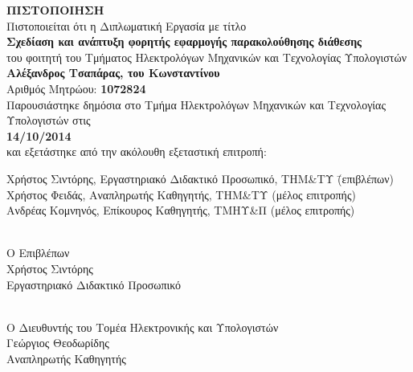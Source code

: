 \thispagestyle{empty}

\begin{center}

    \textbf{\LARGE ΠΙΣΤΟΠΟΙΗΣΗ}\\[2em]
    
    Πιστοποιείται ότι η Διπλωματική Εργασία με τίτλο \\[1em]
    
    \textbf{\Large Σχεδίαση και ανάπτυξη φορητής εφαρμογής παρακολούθησης διάθεσης} \\[2em]
    
    του φοιτητή του Τμήματος Ηλεκτρολόγων Μηχανικών και Τεχνολογίας Υπολογιστών \\[2em]
    
    \textbf{\large Αλέξανδρος Τσαπάρας, του Κωνσταντίνου} \\[1em]
    
    Αριθμός Μητρώου: \textbf{1072824} \\[2em]
    
    Παρουσιάστηκε δημόσια στο Τμήμα Ηλεκτρολόγων Μηχανικών και Τεχνολογίας Υπολογιστών στις \\[2em]
    
    \textbf{14/10/2014} \\[2em]
    
    και εξετάστηκε από την ακόλουθη εξεταστική επιτροπή: \\[3em]
    
    \begin{tabbing}
        Χρήστος Σιντόρης, Εργαστηριακό Διδακτικό Προσωπικό, ΤΗΜ\&ΤΥ \hspace{1cm} \= (επιβλέπων) \\
        Χρήστος Φειδάς, Αναπληρωτής Καθηγητής, ΤΗΜ\&ΤΥ \> (μέλος επιτροπής) \\
        Ανδρέας Κομνηνός, Επίκουρος Καθηγητής, ΤΜΗΥ\&Π \> (μέλος επιτροπής)
    \end{tabbing}
    
    \vfill
    
    \begin{minipage}[t]{0.45\textwidth}
        \begin{center}
            \underline{\hspace{5cm}} \\[0.2em]
            Ο Επιβλέπων \\[3.5em]
            Χρήστος Σιντόρης \\[0.5em]
            Εργαστηριακό Διδακτικό Προσωπικό
        \end{center}
    \end{minipage}%
    \hfill
    \begin{minipage}[t]{0.45\textwidth}
        \begin{center}
            \underline{\hspace{5cm}} \\[0.2em]
            Ο Διευθυντής του Τομέα Ηλεκτρονικής και Υπολογιστών \\[1.6em] 
            Γεώργιος Θεοδωρίδης \\[0.5em]
            Αναπληρωτής Καθηγητής
        \end{center}
    \end{minipage}  
    
\end{center}

\thispagestyle{empty}